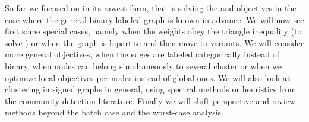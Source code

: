 
So far we focused on \pcc{} in its rawest form, that is solving the \mind{} and \maxa{} objectives
in the case where the general binary-labeled graph is known in advance. We will now see first some
special cases, namely when the weights obey the triangle inequality (to solve \msc{}) or when the
graph is bipartite and then move to variants. We will consider more general objectives, when the
edges are labeled categorically instead of binary, when nodes can belong simultaneously to several
cluster or when we optimize local objectives per nodes instead of global ones. We will also look at
clustering in signed graphs in general, using spectral methods or heuristics from the community
detection literature. Finally we will shift perspective and review methods beyond the batch case and
the worst-case analysis.


